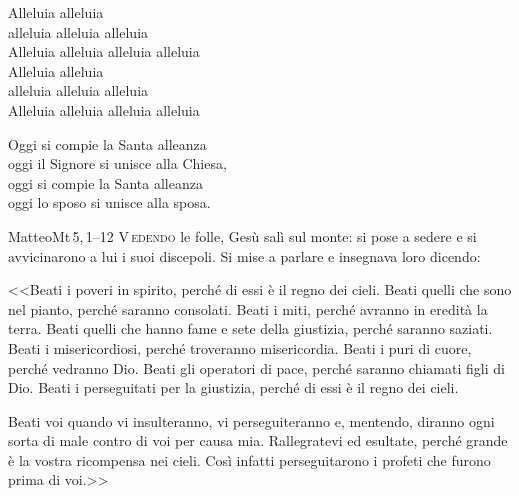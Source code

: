 \documentclass[11pt]{book}
\begin{document}
\settowidth{\versewidth}{Alleluia alleluia alleluia alleluia}
\begin{canzone}%
\begin{ritornello}
Alleluia alleluia\\
alleluia alleluia alleluia\\
Alleluia alleluia alleluia alleluia\\
Alleluia alleluia\\
alleluia alleluia alleluia\\
Alleluia alleluia alleluia alleluia
\end{ritornello}

Oggi si compie la Santa alleanza\\
oggi il Signore si unisce alla Chiesa,\\
oggi si compie la Santa alleanza\\
oggi lo sposo si unisce alla sposa.
\end{canzone}
\begin{vangelo}{Matteo}{Mt\,5,\,1--12}
\lettrine[lines=3]{V}{\,edendo} le folle, Gesù salì sul monte: si pose a sedere e si avvicinarono a lui i suoi discepoli. Si mise a parlare e insegnava loro dicendo:

<<Beati i poveri in spirito, perché di essi è il regno dei cieli.
Beati quelli che sono nel pianto, perché saranno consolati.
Beati i miti, perché avranno in eredità la terra.
Beati quelli che hanno fame e sete della giustizia, perché saranno saziati.
Beati i misericordiosi, perché troveranno misericordia.
Beati i puri di cuore, perché vedranno Dio.
Beati gli operatori di pace, perché saranno chiamati figli di Dio.
Beati i perseguitati per la giustizia, perché di essi è il regno dei cieli.

Beati voi quando vi insulteranno, vi perseguiteranno e, mentendo, diranno ogni sorta di male contro di voi per causa mia. Rallegratevi ed esultate, perché grande è la vostra ricompensa nei cieli. Così infatti perseguitarono i profeti che furono prima di voi.>>
\end{vangelo}
\matrintro
\medskip

\matrpre
\medskip

\consintro
\medskip

\promesse
\medskip

\preghpost


\benedizioneanelli

\medskip
\end{document}
